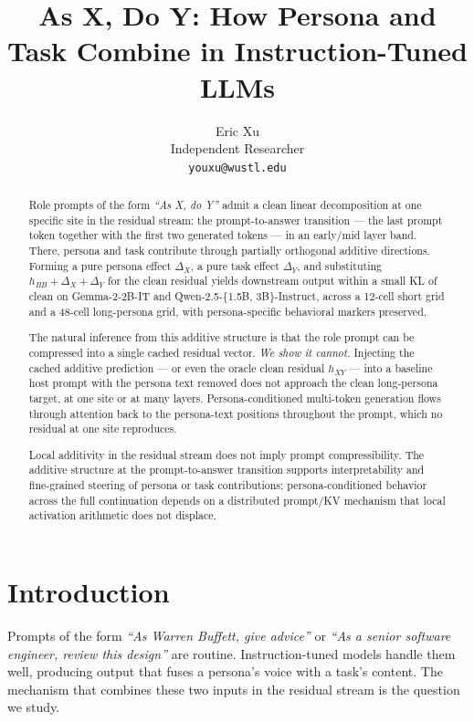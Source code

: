 \documentclass[11pt]{article}
\title{As X, Do Y: How Persona and Task Combine in Instruction-Tuned LLMs}
\author{Eric Xu \\ Independent Researcher \\ \texttt{youxu@wustl.edu}}
\date{}
\begin{document}
\maketitle

\begin{abstract}
Role prompts of the form \emph{``As X, do Y''} admit a clean linear decomposition at one specific site in the residual stream: the prompt-to-answer transition --- the last prompt token together with the first two generated tokens --- in an early/mid layer band. There, persona and task contribute through partially orthogonal additive directions. Forming a pure persona effect $\Delta_X$, a pure task effect $\Delta_Y$, and substituting $h_{BB} + \Delta_X + \Delta_Y$ for the clean residual yields downstream output within a small KL of clean on Gemma-2-2B-IT and Qwen-2.5-\{1.5B, 3B\}-Instruct, across a 12-cell short grid and a 48-cell long-persona grid, with persona-specific behavioral markers preserved.

The natural inference from this additive structure is that the role prompt can be compressed into a single cached residual vector. \emph{We show it cannot.} Injecting the cached additive prediction --- or even the oracle clean residual $h_{XY}$ --- into a baseline host prompt with the persona text removed does not approach the clean long-persona target, at one site or at many layers. Persona-conditioned multi-token generation flows through attention back to the persona-text positions throughout the prompt, which no residual at one site reproduces.

Local additivity in the residual stream does not imply prompt compressibility. The additive structure at the prompt-to-answer transition supports interpretability and fine-grained steering of persona or task contributions; persona-conditioned behavior across the full continuation depends on a distributed prompt/KV mechanism that local activation arithmetic does not displace.
\end{abstract}

\section{Introduction}

Prompts of the form \emph{``As Warren Buffett, give advice''} or \emph{``As a senior software engineer, review this design''} are routine. Instruction-tuned models handle them well, producing output that fuses a persona's voice with a task's content. The mechanism that combines these two inputs in the residual stream is the question we study.
\end{document}
